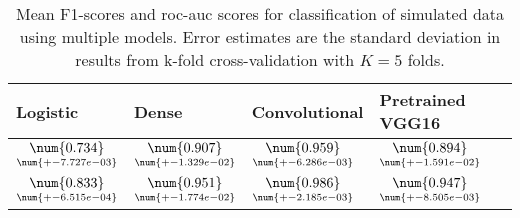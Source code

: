\begin{table}
\centering
\caption{
Mean F1-scores and roc-auc scores for classification of simulated data using multiple models. 
Error estimates are the standard deviation in results from k-fold cross-validation 
with $K=5$ folds.
}
\label{tab:classification-simulated-f1-auc}
\begin{tabular}{llll}
\toprule
                                           Logistic &                                               Dense &                                       Convolutional &                                    Pretrained VGG16 \\
\midrule
 $\underset{\num{+- 7.727e-03 }  }{\num{ 0.734 } }$ &  $\underset{\num{+- 1.329e-02 }  }{\num{ 0.907 } }$ &  $\underset{\num{+- 6.286e-03 }  }{\num{ 0.959 } }$ &  $\underset{\num{+- 1.591e-02 }  }{\num{ 0.894 } }$ \\
 $\underset{\num{+- 6.515e-04 }  }{\num{ 0.833 } }$ &  $\underset{\num{+- 1.774e-02 }  }{\num{ 0.951 } }$ &  $\underset{\num{+- 2.185e-03 }  }{\num{ 0.986 } }$ &  $\underset{\num{+- 8.505e-03 }  }{\num{ 0.947 } }$ \\
\bottomrule
\end{tabular}
\end{table}
